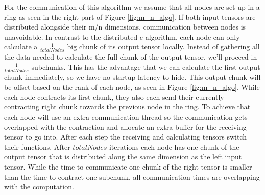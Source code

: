 For the communication of this algorithm we assume that all nodes are set up in a ring as seen in the right part of Figure \ref{fig:m_n_algo}.
If both input tensors are distributed alongside their m/n dimensions, communication between nodes is unavoidable.
In contrast to the distributed c algorithm, each node can only calculate a $\frac{1}{totalNodes}$ big chunk of  its output tensor locally.
Instead of gathering all the data needed to calculate the full chunk of the output tensor, we'll proceed in $\frac{1}{totalNodes}$ subchunks.
This has the advantage that we can calculate the first output chunk immediately, so we have no startup latency to hide.
This output chunk will be offset based on the rank of each node, as seen in Figure \ref{fig:m_n_algo}.
While each node contracts its first chunk, they also each send their currently contracting right chunk towards the previous node in the ring.
To achieve that each node will use an extra communication thread so the communication gets overlapped with the contraction and allocate an extra buffer for the receiving tensor to go into.
After each step the receiving and calculating tensors switch their functions.
After $totalNodes$ iterations each node has one chunk of the output tensor that is distributed along the same dimension as the left input tensor.
While the time to communicate one chunk of the right tensor is smaller than the time to contract one subchunk, all communication times are overlapping with the computation.

